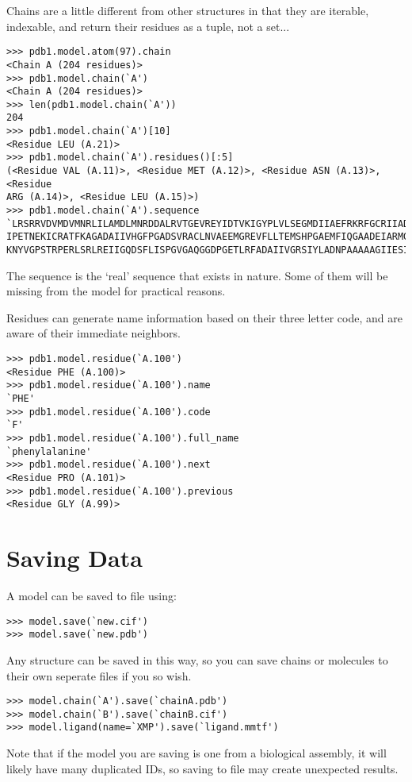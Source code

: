 Chains are a little different from other structures in that they are iterable,
indexable, and return their residues as a tuple, not a set...

\begin{verbatim}
>>> pdb1.model.atom(97).chain
<Chain A (204 residues)>
>>> pdb1.model.chain(`A')
<Chain A (204 residues)>
>>> len(pdb1.model.chain(`A'))
204
>>> pdb1.model.chain(`A')[10]
<Residue LEU (A.21)>
>>> pdb1.model.chain(`A').residues()[:5]
(<Residue VAL (A.11)>, <Residue MET (A.12)>, <Residue ASN (A.13)>, <Residue
ARG (A.14)>, <Residue LEU (A.15)>)
>>> pdb1.model.chain(`A').sequence
`LRSRRVDVMDVMNRLILAMDLMNRDDALRVTGEVREYIDTVKIGYPLVLSEGMDIIAEFRKRFGCRIIADFKVAD
IPETNEKICRATFKAGADAIIVHGFPGADSVRACLNVAEEMGREVFLLTEMSHPGAEMFIQGAADEIARMGVDLGV
KNYVGPSTRPERLSRLREIIGQDSFLISPGVGAQGGDPGETLRFADAIIVGRSIYLADNPAAAAAGIIESIKDLLI'
\end{verbatim}

The sequence is
the `real' sequence that exists in nature. Some of them will be
missing from the model for practical reasons.

Residues can generate name information based on their three letter code, and are
aware of their immediate neighbors.

\begin{verbatim}
>>> pdb1.model.residue(`A.100')
<Residue PHE (A.100)>
>>> pdb1.model.residue(`A.100').name
`PHE'
>>> pdb1.model.residue(`A.100').code
`F'
>>> pdb1.model.residue(`A.100').full_name
`phenylalanine'
>>> pdb1.model.residue(`A.100').next
<Residue PRO (A.101)>
>>> pdb1.model.residue(`A.100').previous
<Residue GLY (A.99)>
\end{verbatim}

\section{Saving Data}

A model can be saved to file using:

\begin{verbatim}
>>> model.save(`new.cif')
>>> model.save(`new.pdb')
\end{verbatim}

Any structure can be saved in this way, so you can save chains or molecules to
their own seperate files if you so wish.

\begin{verbatim}
>>> model.chain(`A').save(`chainA.pdb')
>>> model.chain(`B').save(`chainB.cif')
>>> model.ligand(name=`XMP').save(`ligand.mmtf')
\end{verbatim}

Note that if the model you are saving is one from a biological assembly, it will
likely have many duplicated IDs, so saving to file may create unexpected
results.


